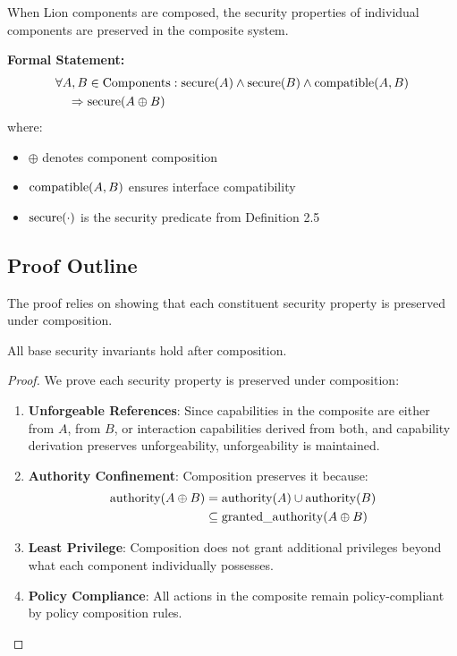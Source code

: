 \begin{theorem}
When Lion components are composed, the security properties of individual components are preserved in the composite system.

\textbf{Formal Statement:}
\begin{align}
&\forall A, B \in \text{Components}: \text{secure}(A) \land \text{secure}(B) \land \text{compatible}(A, B) \nonumber \\
&\quad \Rightarrow \text{secure}(A \oplus B)
\end{align}
where:
\begin{itemize}
\item $\oplus$ denotes component composition
\item $\text{compatible}(A, B)$ ensures interface compatibility
\item $\text{secure}(\cdot)$ is the security predicate from Definition 2.5
\end{itemize}
\end{theorem}

\subsection{Proof Outline}

The proof relies on showing that each constituent security property is preserved under composition.

\begin{lemma}
All base security invariants hold after composition.
\end{lemma}

\begin{proof}
We prove each security property is preserved under composition:

\begin{enumerate}
\item \textbf{Unforgeable References}: Since capabilities in the composite are either from $A$, from $B$, or interaction capabilities derived from both, and capability derivation preserves unforgeability, unforgeability is maintained.

\item \textbf{Authority Confinement}: Composition preserves it because:
\begin{align}
\text{authority}(A \oplus B) &= \text{authority}(A) \cup \text{authority}(B) \nonumber \\
&\subseteq \text{granted\_authority}(A \oplus B)
\end{align}

\item \textbf{Least Privilege}: Composition does not grant additional privileges beyond what each component individually possesses.

\item \textbf{Policy Compliance}: All actions in the composite remain policy-compliant by policy composition rules.
\end{enumerate}
\end{proof}

